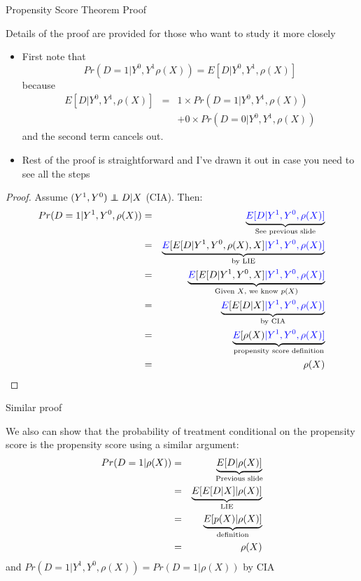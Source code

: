 \documentclass{beamer}
\newcommand\independent{\protect\mathpalette{\protect\independenT}{\perp}}
\def\independenT#1#2{\mathrel{\rlap{$#1#2$}\mkern2mu{#1#2}}}
\begin{document}
\begin{frame}{Propensity Score Theorem Proof}
	
	 Details of the proof are provided for those who want to study it more closely
	\begin{itemize}
	\item First note that$$Pr(D=1|Y^0,Y^1\rho(X)) = E[D | Y^0,Y^1,\rho(X)]$$because
		\begin{eqnarray*}
		E[D|Y^0,Y^1,\rho(X)] &=& 1\times Pr(D=1|Y^0,Y^1,\rho(X)) \\
		& & + 0 \times Pr(D=0 | Y^0,Y^1,\rho(X))
		\end{eqnarray*}and the second term cancels out.
	\item Rest of the proof is straightforward and I've drawn it out in case you need to see all the steps
	\end{itemize}
\end{frame}

\begin{frame}[plain,shrink=5]
	
	\begin{proof}
	Assume $(Y^1,Y^0)\independent{D}|X$ (CIA).  Then:
		\begin{eqnarray*}
		Pr(D=1 | Y^1,Y^0, \rho(X)) &=& \underbrace{\textcolor{blue}{E[D | Y^1, Y^0, \rho(X)]}}_{ \mathclap{\text{See previous slide}}} \\
		&=&\underbrace{\textcolor{blue}{E} [ E [ D | Y^1,Y^0, \rho(X), X] \textcolor{blue}{| Y^1,Y^0,\rho(X)]}}_{ \mathclap{\text{by LIE}}} \\
		&=&\underbrace{\textcolor{blue}{E} [ E [ D | Y^1,Y^0,X] \textcolor{blue}{| Y^1,Y^0,\rho(X)]}}_{ \mathclap{\text{Given $X$, we know $p(X)$}}} \\
		&=&\underbrace{\textcolor{blue}{E} [E [D | X] \textcolor{blue}{| Y^1,Y^0,\rho(X)]}}_{ \mathclap{\text{by CIA}}} \\
		&=& \underbrace{\textcolor{blue}{E}[\rho(X) \textcolor{blue}{| Y^1, Y^0, \rho(X)]}}_{ \mathclap{\text{propensity score definition}}} \\
		&=& \rho(X)
		\end{eqnarray*}
	\end{proof}
	
\end{frame}

\begin{frame}{Similar proof}

	 We also can show that the probability of treatment conditional on the propensity score is the propensity score using a similar argument:
		\begin{eqnarray*}
		Pr(D=1| \rho(X)) &=& \underbrace{E[ D | \rho(X) ]}_{\mathclap{\text{Previous slide}}} \\
		&=& \underbrace{E [ E [D | X] | \rho(X)]}_{ \mathclap{\text{LIE}}} \\
		&=& \underbrace{E[p(X) | \rho(X)]}_{ \mathclap{\text{definition}}} \\
		&=& \rho(X)
		\end{eqnarray*}and $Pr(D=1 | Y^1, Y^0, \rho(X)) = Pr(D=1| \rho(X))$ by CIA
\end{frame}
\end{document}
